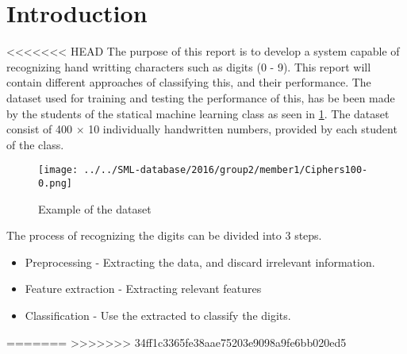 \section{Introduction}
<<<<<<< HEAD
The purpose of this report is to develop a system capable of recognizing hand writting characters such as digits (0 - 9).  This report will contain different approaches of classifying this, and their performance.  The dataset used for training and testing the performance of this, has be been made by the students of the statical machine learning class  as seen in \ref{fig:data}. The dataset consist of 400 $\times$ 10 individually handwritten numbers,  provided by each  student of the class.  

\begin{figure}[H]
\centering
\texttt{[image: ../../SML-database/2016/group2/member1/Ciphers100-0.png]}
\caption{Example of the  dataset}
\label{fig:data}
\end{figure} 

The process of recognizing the digits can be divided into 3 steps. 
\begin{itemize}
\item Preprocessing - Extracting the data, and discard irrelevant information. 
\item Feature extraction - Extracting relevant features 
\item Classification - Use the extracted to classify the digits. 
\end{itemize}

=======
>>>>>>> 34ff1c3365fe38aae75203e9098a9fe6bb020ed5
